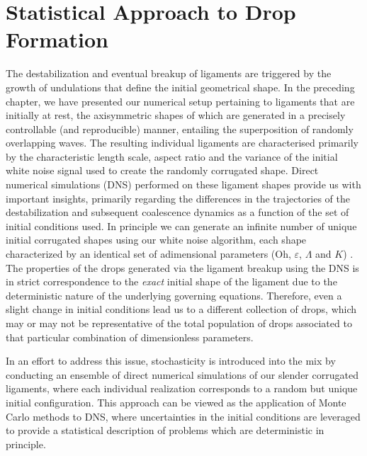 \setchapterpreamble[u]{\margintoc}
\chapter{Statistical Approach to Drop Formation}

%


The destabilization and eventual breakup of ligaments are triggered 
by the growth of undulations that define the initial geometrical shape. 
In the preceding chapter, we have presented our numerical setup pertaining to 
ligaments that are initially at rest, the axisymmetric shapes of which 
are generated in a precisely controllable (and reproducible) manner, 
entailing the superposition of randomly overlapping waves. 
The resulting individual ligaments are characterised primarily 
by the characteristic length scale, aspect ratio and the variance of 
the initial white noise signal used to create the randomly corrugated shape.
Direct numerical simulations (DNS) performed on these ligament shapes 
provide us with important insights, primarily regarding the differences in the 
trajectories of the destabilization and subsequent coalescence dynamics
as a function of the set of initial conditions used. 
In principle we can generate an infinite number of unique initial corrugated shapes 
using our white noise algorithm, each shape characterized by an identical set 
of adimensional parameters ($\textrm{Oh}$, $\varepsilon$, $\Lambda$ and $K$) .
The properties of the drops generated via the ligament breakup 
using the DNS is in strict correspondence to the \textit{exact} initial shape 
of the ligament due to the deterministic nature of the underlying governing equations. 
Therefore, even a slight change in initial conditions lead us to a different collection 
of drops, which may or may not be representative of the total population of drops associated to 
that particular combination of dimensionless parameters. 

In an effort to address this issue, stochasticity is introduced into
the mix by conducting an ensemble of direct numerical simulations of our 
slender corrugated ligaments, where each individual realization corresponds
to a random but unique initial configuration. 
This approach can be viewed as the application of Monte Carlo methods to DNS, 
where uncertainties in the initial conditions are leveraged to provide a statistical 
description of problems which are deterministic in principle. 



